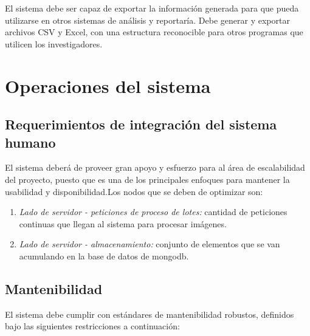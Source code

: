 \documentclass{scrreprt}
\begin{document}
El sistema debe ser capaz de exportar la información generada para que pueda utilizarse en otros sistemas de análisis y reportaría. Debe generar y exportar archivos CSV y Excel, con una estructura reconocible para otros programas que utilicen los investigadores.\\

\section{Operaciones del sistema}

\subsection{Requerimientos de integración del sistema humano}
El sistema deberá de proveer gran apoyo y esfuerzo para al área de escalabilidad del proyecto, puesto que es una de los principales enfoques para mantener la usabilidad y disponibilidad.Los nodos que se deben de optimizar son:\\
\begin{enumerate}[label=\alph*.]
\item \textit{Lado de servidor - peticiones de proceso de lotes:} cantidad de peticiones continuas que llegan al sistema para procesar imágenes. 
\item \textit{Lado de servidor - almacenamiento:} conjunto de elementos que se van acumulando en la base de datos de mongodb.

\end{enumerate}


\subsection{Mantenibilidad}
El sistema debe cumplir con estándares de mantenibilidad robustos, definidos bajo las siguientes restricciones a continuación:
\end{document}
